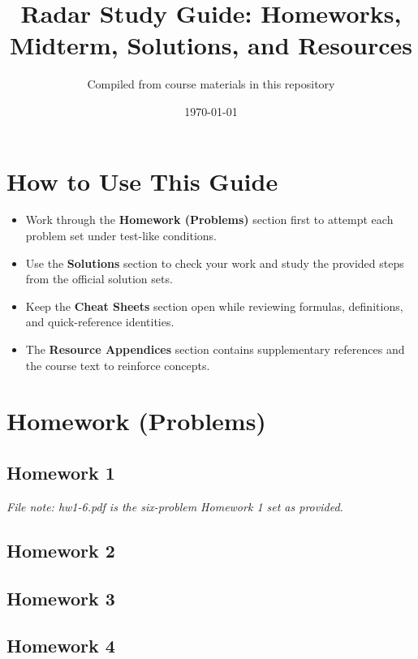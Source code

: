 \documentclass[12pt]{article}
\title{Radar Study Guide: Homeworks, Midterm, Solutions, and Resources}
\author{Compiled from course materials in this repository}
\date{\today}
\begin{document}
\maketitle
\tableofcontents
\newpage

\section*{How to Use This Guide}
\begin{itemize}[leftmargin=*]
  \item Work through the \textbf{Homework (Problems)} section first to attempt each problem set under test-like conditions.
  \item Use the \textbf{Solutions} section to check your work and study the provided steps from the official solution sets.
  \item Keep the \textbf{Cheat Sheets} section open while reviewing formulas, definitions, and quick-reference identities.
  \item The \textbf{Resource Appendices} section contains supplementary references and the course text to reinforce concepts.
\end{itemize}

\section*{Homework (Problems)}
\subsection*{Homework 1}
\noindent\textit{File note: hw1-6.pdf is the six-problem Homework 1 set as provided.}


\subsection*{Homework 2}


\subsection*{Homework 3}


\subsection*{Homework 4}

\end{document}
